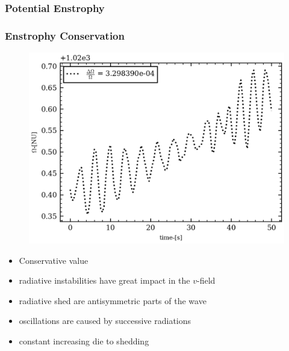 \documentclass[numbering=fraction]{beamer}
\begin{document}
\subsubsection{Potential Enstrophy}
\begin{frame}
    \frametitle{Enstrophy Conservation}
    \begin{minipage}{.6\linewidth}

        \begin{figure}[H]
            \centering
            \includegraphics[width=\linewidth]{./figure/potential_enstrophy.png}
        \end{figure}
    \end{minipage}
    \begin{minipage}{.38\linewidth}

        \begin{itemize}
            \item Conservative value
            \item radiative instabilities have great impact in the $v$-field
            \item radiative shed are antisymmetric parts of the wave
            \item oscillations are caused by successive radiations
            \item constant increasing die to shedding
        \end{itemize}
    \end{minipage}
\end{frame}
\end{document}
